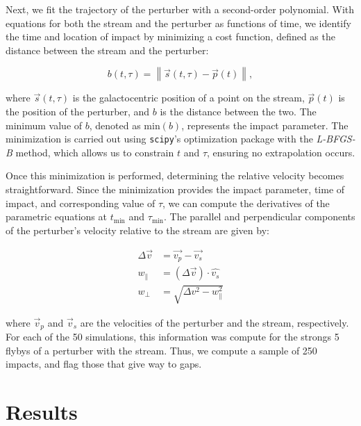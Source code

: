 \documentclass[draft]{aa}
\begin{document}
    Next, we fit the trajectory of the perturber with a second-order polynomial. With equations for both the stream and the perturber as functions of time, we identify the time and location of impact by minimizing a cost function, defined as the distance between the stream and the perturber:

    \begin{equation} b(t, \tau) = \left\lVert \vec{s}(t, \tau) - \vec{p}(t) \right\rVert, \end{equation}

    where $\vec{s}(t, \tau)$ is the galactocentric position of a point on the stream, $\vec{p}(t)$ is the position of the perturber, and $b$ is the distance between the two. The minimum value of $b$, denoted as $\text{min}(b)$, represents the impact parameter. The minimization is carried out using \texttt{scipy}'s optimization package with the \textit{L-BFGS-B} method, which allows us to constrain $t$ and $\tau$, ensuring no extrapolation occurs.

    Once this minimization is performed, determining the relative velocity becomes straightforward. Since the minimization provides the impact parameter, time of impact, and corresponding value of $\tau$, we can compute the derivatives of the parametric equations at $t_{\text{min}}$ and $\tau_{\text{min}}$. The parallel and perpendicular components of the perturber's velocity relative to the stream are given by:

    \begin{align}
      \Delta \vec{v} &=\vec{v_p} - \vec{v_s} \\
      w_\parallel &= \left(\Delta \vec{v}\right)\cdot \hat{v_s}\\  
      w_\perp &=  \sqrt{\Delta v ^2 - w_\parallel ^ 2}
      \end{align}


    where $\vec{v}_p$ and $\vec{v}_s$ are the velocities of the perturber and the stream, respectively. For each of the 50 simulations, this information was compute for the strongs 5 flybys of a perturber with the stream. Thus, we compute a sample of 250 impacts, and flag those that give way to gaps. 


\section{Results}
\end{document}
